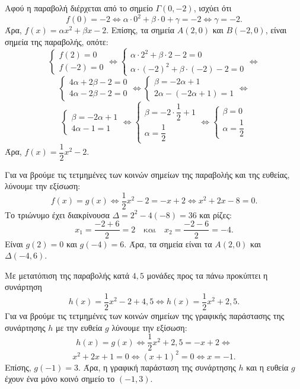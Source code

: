 \begin{alist}
\item Αφού η παραβολή διέρχεται από το σημείο $\varGamma(0, -2)$, ισχύει ότι
\[f(0) = -2 \Leftrightarrow \alpha \cdot 0^2 + \beta \cdot 0 + \gamma = -2 \Leftrightarrow \gamma = -2.\]
Άρα, $f(x) = \alpha x^2 + \beta x - 2$. Επίσης, τα σημεία $A(2,0)$ και $B(-2,0)$, είναι σημεία της παραβολής, οπότε:
\[\begin{cases} f(2) = 0 \\ f(-2) = 0 \end{cases} \Leftrightarrow \begin{cases} \alpha \cdot 2^2 + \beta \cdot 2 - 2 = 0 \\ \alpha \cdot (-2)^2 + \beta \cdot (-2) - 2 = 0 \end{cases} \Leftrightarrow\]
\[\begin{cases} 4\alpha + 2\beta - 2 = 0 \\ 4\alpha - 2\beta - 2 = 0 \end{cases} \Leftrightarrow \begin{cases} \beta = -2\alpha + 1 \\ 2\alpha - (-2\alpha + 1) = 1 \end{cases} \Leftrightarrow\]
\[\begin{cases} \beta = -2\alpha + 1 \\ 4\alpha - 1 = 1 \end{cases} \Leftrightarrow \begin{cases} \beta = -2 \cdot \dfrac{1}{2} + 1 \\ \alpha = \dfrac{1}{2} \end{cases} \Leftrightarrow \begin{cases} \beta = 0 \\ \alpha = \dfrac{1}{2} \end{cases}\]
Άρα, $f(x) = \dfrac{1}{2}x^2 - 2$.
\item Για να βρούμε τις τετμημένες των κοινών σημείων της παραβολής και της ευθείας, λύνουμε την εξίσωση:
\[f(x) = g(x) \Leftrightarrow \dfrac{1}{2}x^2 - 2 = -x + 2 \Leftrightarrow x^2 + 2x - 8 = 0.\]
Το τριώνυμο έχει διακρίνουσα $\varDelta = 2^2 - 4(-8) = 36$ και ρίζες:
\[x_1 = \dfrac{-2 + 6}{2} = 2 \quad \text{και} \quad x_2 = \dfrac{-2 - 6}{2} = -4.\]
Είναι $g(2) = 0$ και $g(-4) = 6$. Άρα, τα σημεία είναι τα $A(2,0)$ και $\varDelta(-4,6)$.
\item Με μετατόπιση της παραβολής κατά $4{,}5$ μονάδες προς τα πάνω προκύπτει η συνάρτηση
\[h(x) = \dfrac{1}{2}x^2 - 2 + 4{,}5 \Leftrightarrow h(x) = \dfrac{1}{2}x^2 + 2{,}5.\]
Για να βρούμε τις τετμημένες των κοινών σημείων της γραφικής παράστασης της συνάρτησης $h$ με την ευθεία $g$ λύνουμε την εξίσωση:
\[h(x) = g(x) \Leftrightarrow \dfrac{1}{2}x^2 + 2{,}5 = -x + 2 \Leftrightarrow\]
\[x^2 + 2x + 1 = 0 \Leftrightarrow (x + 1)^2 = 0 \Leftrightarrow x = -1.\]
Επίσης, $g(-1) = 3$. Άρα, η γραφική παράσταση της συνάρτησης $h$ και η ευθεία $g$ έχουν ένα μόνο κοινό σημείο το $(-1, 3)$.
\end{alist}

